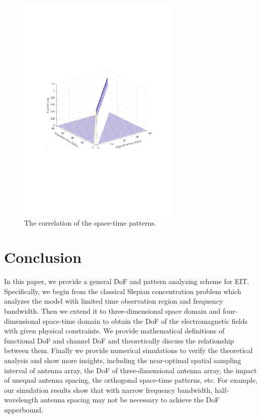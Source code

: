 \documentclass[12pt,draftclsnofoot,journal,onecolumn]{IEEEtran}
\begin{document}
\begin{figure}
	\centering 
	\includegraphics[width=0.7\textwidth]{figs/eigen_function_correlation.pdf} 
	\caption{The correlation of the space-time patterns.} 
	\label{pattern_correlation}
\end{figure}

\section{Conclusion}
In this paper, we provide a general DoF and pattern analyzing scheme for EIT. Specifically, we begin from the classical Slepian concentration problem which analyzes the model with limited time observation region and frequency bandwidth. Then we extend it to three-dimensional space domain and four-dimensional space-time domain to obtain the DoF of the electromagnetic fields with given physical constraints. We provide mathematical definitions of functional DoF and channel DoF and theoretically discuss the relationship between them. Finally we provide numerical simulations to verify the theoretical analysis and show more insights, including the near-optimal spatial sampling interval of antenna array, the DoF of three-dimensional antenna array, the impact of unequal antenna spacing, the orthogonal space-time patterns, etc. For example, our simulation results show that with narrow frequency bandwidth, half-wavelength antenna spacing may not be necessary to achieve the DoF upperbound.
\end{document}
